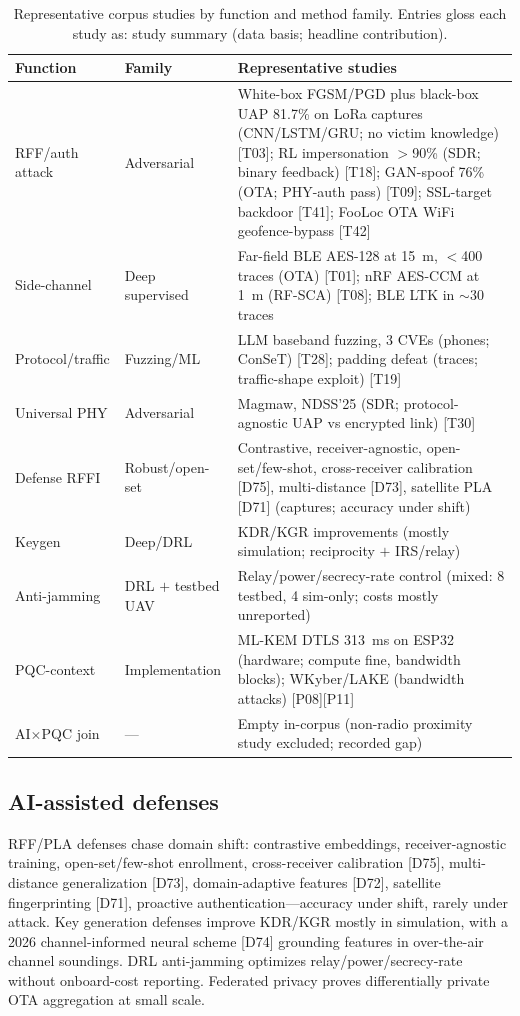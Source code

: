 \begin{table}[tbp]
\centering
\footnotesize
\setlength{\tabcolsep}{3pt}
\caption{Representative corpus studies by function and method family. Entries gloss each study as: study summary (data basis; headline contribution).}
\label{tab:representative}
\begin{tabular}{@{}>{\raggedright\arraybackslash}p{2.4cm} >{\raggedright\arraybackslash}p{2.4cm} >{\raggedright\arraybackslash}p{9.2cm}@{}}
\toprule
Function & Family & Representative studies \\
\midrule
RFF/auth attack & Adversarial & White-box FGSM/PGD plus black-box UAP 81.7\% on LoRa captures (CNN/LSTM/GRU; no victim knowledge) [T03]; RL impersonation $>$90\% (SDR; binary feedback) [T18]; GAN-spoof 76\% (OTA; PHY-auth pass) [T09]; SSL-target backdoor [T41]; FooLoc OTA WiFi geofence-bypass [T42] \\
Side-channel & Deep supervised & Far-field BLE AES-128 at 15~m, $<$400 traces (OTA) [T01]; nRF AES-CCM at 1~m (RF-SCA) [T08]; BLE LTK in $\sim$30 traces \\
Protocol/traffic & Fuzzing/ML & LLM baseband fuzzing, 3 CVEs (phones; ConSeT) [T28]; padding defeat (traces; traffic-shape exploit) [T19] \\
Universal PHY & Adversarial & Magmaw, NDSS'25 (SDR; protocol-agnostic UAP vs encrypted link) [T30] \\
Defense RFFI & Robust/open-set & Contrastive, receiver-agnostic, open-set/few-shot, cross-receiver calibration [D75], multi-distance [D73], satellite PLA [D71] (captures; accuracy under shift) \\
Keygen & Deep/DRL & KDR/KGR improvements (mostly simulation; reciprocity $+$ IRS/relay) \\
Anti-jamming & DRL $+$ testbed UAV & Relay/power/secrecy-rate control (mixed: 8 testbed, 4 sim-only; costs mostly unreported) \\
PQC-context & Implementation & ML-KEM DTLS 313~ms on ESP32 (hardware; compute fine, bandwidth blocks); WKyber/LAKE (bandwidth attacks) [P08][P11] \\
AI$\times$PQC join & --- & Empty in-corpus (non-radio proximity study excluded; recorded gap) \\
\bottomrule
\end{tabular}
\end{table}

\subsection{AI-assisted defenses}
\label{sec:defense}
RFF/PLA defenses chase domain shift: contrastive embeddings, receiver-agnostic training, open-set/few-shot enrollment, cross-receiver calibration [D75], multi-distance generalization [D73], domain-adaptive features [D72], satellite fingerprinting [D71], proactive authentication---accuracy under shift, rarely under attack. Key generation defenses improve KDR/KGR mostly in simulation, with a 2026 channel-informed neural scheme [D74] grounding features in over-the-air channel soundings. DRL anti-jamming optimizes relay/power/secrecy-rate without onboard-cost reporting. Federated privacy proves differentially private OTA aggregation at small scale.


